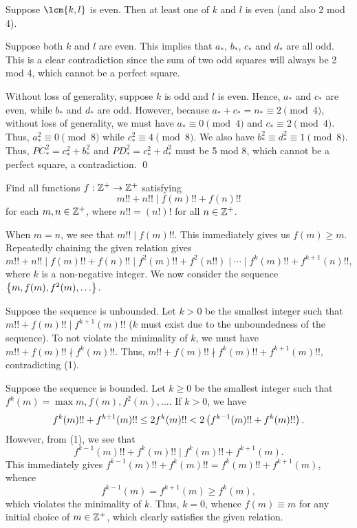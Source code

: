  Suppose $\lcm{k, l}$ is even. Then at least one of $k$ and $l$ is even (and also 2 mod 4). 

 Suppose both $k$ and $l$ are even. This implies that $a_\ast$, $b_\ast$, $c_\ast$ and $d_\ast$ are all odd. This is a clear contradiction since the sum of two odd squares will always be 2 mod 4, which cannot be a perfect square.

 Without loss of generality, suppose $k$ is odd and $l$ is even. Hence, $a_\ast$ and $c_\ast$ are even, while $b_\ast$ and $d_\ast$ are odd. However, because $a_\ast + c_\ast = n_\ast \equiv 2 \pmod{4}$, without loss of generality, we must have $a_\ast \equiv 0 \pmod{4}$ and $c_\ast \equiv 2 \pmod{4}$. Thus, $a_\ast^2 \equiv 0 \pmod{8}$ while $c_\ast^2 \equiv 4 \pmod{8}$. We also have $b_\ast^2 \equiv d_\ast^2 \equiv 1 \pmod{8}$. Thus, $PC_\ast^2 = c_\ast^2 + b_\ast^2$ and $PD_\ast^2 = c_\ast^2 + d_\ast^2$ must be 5 mod 8, which cannot be a perfect square, a contradiction. \qed

\begin{question}[${f(m) \equiv m}$]\label{A::2022-O-2-3}
    Find all functions $f : \mathbb{Z}^+ \to \mathbb{Z}^+$ satisfying \[m!! + n!! \mid f(m)!! + f(n)!!\] for each $m, n \in \mathbb{Z}^+$, where $n!! = (n!)!$ for all $n \in \mathbb{Z}^+$.
\end{question}


 When $m = n$, we see that $m!! \mid f(m)!!$. This immediately gives us $f(m) \geq m$. Repeatedly chaining the given relation gives \[m!! + n!! \mid f(m)!! + f(n)!! \mid f^2(m)!! + f^2(n!!) \mid \cdots \mid f^k(m)!! + f^{k+1}(n)!!, \tag{1}\] where $k$ is a non-negative integer. We now consider the sequence $\left\lbrace m, f(m), f^2(m), \ldots \right\rbrace$.

 Suppose the sequence is unbounded. Let $k > 0$ be the smallest integer such that $m!! + f(m)!! \mid f^{k+1}(m)!!$ ($k$ must exist due to the unboundedness of the sequence). To not violate the minimality of $k$, we must have $m!! + f(m)!! \nmid f^k(m)!!$. Thus, $m!! + f(m)!! \nmid f^k(m)!! + f^{k+1}(m)!!$, contradicting (1).

 Suppose the sequence is bounded. Let $k \geq 0$ be the smallest integer such that $f^k(m) = \max{m, f(m), f^2(m), \ldots}$. If $k > 0$, we have \[f^k(m)!! + f^{k+1}(m)!! \leq 2f^k(m)!! < 2\left( f^{k-1}(m)!! + f^k(m)!! \right).\] However, from (1), we see that \[f^{k-1}(m)!! + f^k(m)!! \mid f^k(m)!! + f^{k+1}(m).\] This immediately gives $f^{k-1}(m)!! + f^k(m)!! = f^k(m)!! + f^{k+1}(m)$, whence \[f^{k-1}(m) = f^{k+1}(m) \geq f^k(m),\] which violates the minimality of $k$. Thus, $k =0$, whence $f(m) \equiv m$ for any initial choice of $m \in \mathbb{Z}^+$, which clearly satisfies the given relation.
    

